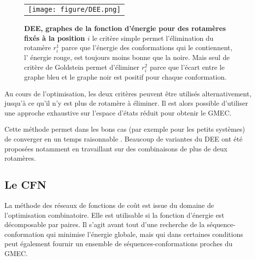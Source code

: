    \begin{figure}[!htbp]
     \centering
     \begin{tabular}{c}
       \texttt{[image: figure/DEE.png]} &
     \end{tabular}
     
     \caption{\textbf{DEE, graphes de la fonction d'énergie pour des rotamères fixés à la position $i$} le critère simple permet l'élimination du rotamère $r^1_i$ parce que l'énergie des conformations qui le contiennent, l' énergie rouge, est toujours moins bonne que la noire. Mais seul de critère de Goldstein permet d'éliminer $r^2_i$ parce que l'écart entre le graphe bleu et le graphe noir est positif pour chaque conformation.}
\label{fig:DEE}
   \end{figure}

Au cours de l'optimisation, les deux critères peuvent être utilisés alternativement, jusqu'à ce qu'il n'y est plus de rotamère à éliminer. Il est alors possible d'utiliser une approche exhaustive sur l'espace d'états réduit pour obtenir le GMEC.

Cette méthode permet dans les bons cas (par exemple pour les petits systèmes) de converger en un temps raisonnable \cite{Leach98}. Beaucoup de variantes du DEE \cite{Pierce00,Lilien05} ont été proposées notamment en travaillant sur des combinaisons de plus de deux rotamères.


\subsection{Le CFN}

La méthode des réseaux de fonctions de coût est issue du domaine de l'optimisation combinatoire. Elle est utilisable si la fonction d'énergie est décomposable par paires. Il s'agit avant tout d'une recherche de la séquence-conformation qui minimise l'énergie globale, mais qui dans certaines conditions peut également fournir un ensemble de séquences-conformations proches du GMEC.


